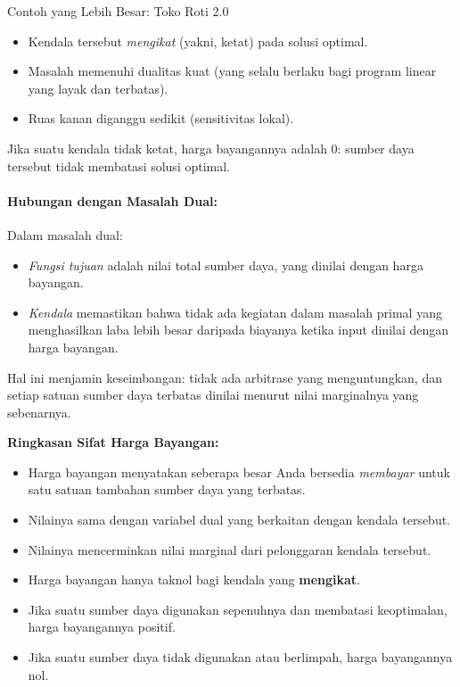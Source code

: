 \begin{example}{Contoh yang Lebih Besar: Toko Roti 2.0}{}
\begin{itemize}
\item Kendala tersebut \emph{mengikat} (yakni, ketat) pada solusi optimal.
\item Masalah memenuhi dualitas kuat (yang selalu berlaku bagi program linear yang layak dan terbatas).
\item Ruas kanan diganggu sedikit (sensitivitas lokal).
\end{itemize}

Jika suatu kendala tidak ketat, harga bayangannya adalah 0: sumber daya tersebut tidak membatasi solusi optimal.

\vspace{1em}
\paragraph{Hubungan dengan Masalah Dual:}
Dalam masalah dual:
\begin{itemize}
\item \emph{Fungsi tujuan} adalah nilai total sumber daya, yang dinilai dengan harga bayangan.
\item \emph{Kendala} memastikan bahwa tidak ada kegiatan dalam masalah primal yang menghasilkan laba lebih besar daripada biayanya ketika input dinilai dengan harga bayangan.
\end{itemize}
Hal ini menjamin keseimbangan: tidak ada arbitrase yang menguntungkan, dan setiap satuan sumber daya terbatas dinilai menurut nilai marginalnya yang sebenarnya.

\vspace{1em}
\noindent\textbf{Ringkasan Sifat Harga Bayangan:}
\begin{itemize}
\item Harga bayangan menyatakan seberapa besar Anda bersedia \emph{membayar} untuk satu satuan tambahan sumber daya yang terbatas.
\item Nilainya sama dengan variabel dual yang berkaitan dengan kendala tersebut.
\item Nilainya mencerminkan nilai marginal dari pelonggaran kendala tersebut.
\item Harga bayangan hanya taknol bagi kendala yang \textbf{mengikat}.
\end{itemize}

\vspace{0.5em}

\begin{itemize}
\item Jika suatu sumber daya digunakan sepenuhnya dan membatasi keoptimalan, harga bayangannya positif.
\item Jika suatu sumber daya tidak digunakan atau berlimpah, harga bayangannya nol.
\end{itemize}
\end{example}

